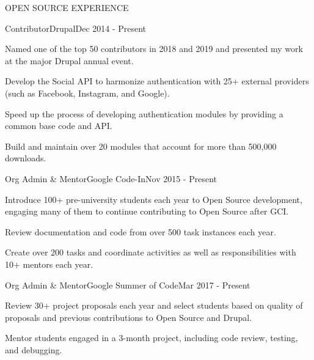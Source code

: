 \documentclass{resume} %
\begin{document}

\begin{rSection}{OPEN SOURCE EXPERIENCE}

\begin{rSubsection}{Contributor}{Drupal}{}{Dec 2014 - Present}
\item Named one of the top 50 contributors in 2018 and 2019 and presented my work at the major Drupal annual event.
\item Develop the Social API to harmonize authentication with 25+ external providers (such as Facebook, Instagram, and Google).
\item Speed up the process of developing authentication modules by providing a common base code and API.
\item Build and maintain over 20 modules that account for more than 500,000 downloads.
\end{rSubsection}


\begin{rSubsection}{Org Admin \& Mentor}{Google Code-In}{}{Nov 2015 - Present}
\item Introduce 100+ pre-university students each year to Open Source development, engaging many of them to continue contributing to Open Source after GCI.
\item Review documentation and code from over 500 task instances each year.
\item Create over 200 tasks and coordinate activities as well as responsibilities with 10+ mentors each year.
\end{rSubsection}


\begin{rSubsection}{Org Admin \& Mentor}{Google Summer of Code}{}{Mar 2017 - Present}
\item Review 30+ project proposals each year and select students based on quality of proposals and previous contributions to Open Source and Drupal.
\item Mentor students engaged in a 3-month project, including code review, testing, and debugging.
\end{rSubsection}

\end{rSection}





\end{document}
